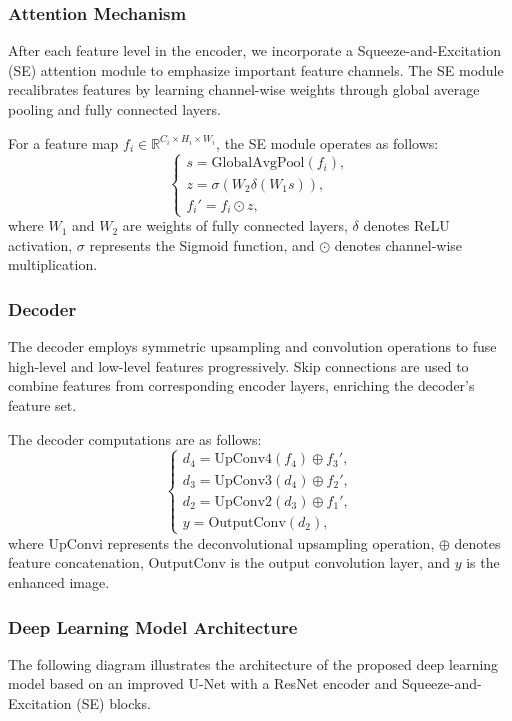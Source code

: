 \documentclass{apmcmthesis}
\begin{document}
\subsubsection{Attention Mechanism}
After each feature level in the encoder, we incorporate a Squeeze-and-Excitation (SE) attention module to emphasize important feature channels. The SE module recalibrates features by learning channel-wise weights through global average pooling and fully connected layers.

For a feature map $f_i \in \mathbb{R}^{C_i \times H_i \times W_i}$, the SE module operates as follows:
\[
\begin{cases}
s = \text{GlobalAvgPool}(f_i), \\
z = \sigma (W_2 \delta (W_1 s)), \\
f_i' = f_i \odot z,
\end{cases}
\]
where $W_1$ and $W_2$ are weights of fully connected layers, $\delta$ denotes ReLU activation, $\sigma$ represents the Sigmoid function, and $\odot$ denotes channel-wise multiplication.

\subsubsection{Decoder}
The decoder employs symmetric upsampling and convolution operations to fuse high-level and low-level features progressively. Skip connections are used to combine features from corresponding encoder layers, enriching the decoder's feature set.

The decoder computations are as follows:
\[
\begin{cases}
d_4 = \text{UpConv4}(f_4) \oplus f_3', \\
d_3 = \text{UpConv3}(d_4) \oplus f_2', \\
d_2 = \text{UpConv2}(d_3) \oplus f_1', \\
y = \text{OutputConv}(d_2),
\end{cases}
\]
where $\text{UpConvi}$ represents the deconvolutional upsampling operation, $\oplus$ denotes feature concatenation, $\text{OutputConv}$ is the output convolution layer, and $y$ is the enhanced image.

\subsubsection{Deep Learning Model Architecture}

The following diagram illustrates the architecture of the proposed deep learning model based on an improved U-Net with a ResNet encoder and Squeeze-and-Excitation (SE) blocks.
\end{document}

